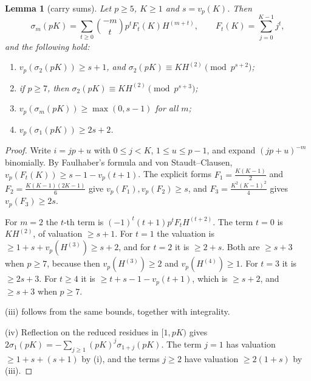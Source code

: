 \documentclass[11pt]{amsart}
\newtheorem{lemma}[theorem]{Lemma}
\theoremstyle{definition}
\theoremstyle{remark}
\newcommand{\vp}{v_p}
\newcommand{\bin}[2]{\binom{#1}{#2}}
\begin{document}
\begin{lemma}[carry sums]\label{lem:carry}
Let $p\ge5$, $K\ge1$ and $s=\vp(K)$. Then
\[
\sigma_m(pK)=\sum_{t\ge0}\bin{-m}{t}p^tF_t(K)H^{(m+t)},\qquad F_t(K)=\sum_{j=0}^{K-1}j^t,
\]
and the following hold:
\begin{enumerate}
\item[(i)] $\vp(\sigma_2(pK))\ge s+1$, and $\sigma_2(pK)\equiv KH^{(2)}\pmod{p^{s+2}}$;
\item[(ii)] if $p\ge7$, then $\sigma_2(pK)\equiv KH^{(2)}\pmod{p^{s+3}}$;
\item[(iii)] $\vp(\sigma_m(pK))\ge\max(0,s-1)$ for all $m$;
\item[(iv)] $\vp(\sigma_1(pK))\ge2s+2$.
\end{enumerate}
\end{lemma}
\begin{proof}
Write $i=jp+u$ with $0\le j<K$, $1\le u\le p-1$, and expand $(jp+u)^{-m}$ binomially.
By Faulhaber's formula and von Staudt--Clausen, $\vp(F_t(K))\ge s-1-\vp(t+1)$. The explicit
forms $F_1=\frac{K(K-1)}2$ and $F_2=\frac{K(K-1)(2K-1)}6$ give $\vp(F_1),\vp(F_2)\ge s$, and
$F_3=\frac{K^2(K-1)^2}{4}$ gives $\vp(F_3)\ge 2s$.

For $m=2$ the $t$-th term is $(-1)^t(t+1)p^tF_tH^{(t+2)}$. The term $t=0$ is $KH^{(2)}$, of
valuation $\ge s+1$. For $t=1$ the valuation is $\ge 1+s+\vp(H^{(3)})\ge s+2$, and for $t=2$
it is $\ge 2+s$. Both are $\ge s+3$ when $p\ge7$, because then $\vp(H^{(3)})\ge2$ and
$\vp(H^{(4)})\ge1$. For $t=3$ it is $\ge 2s+3$. For
$t\ge4$ it is $\ge t+s-1-\vp(t+1)$, which is $\ge s+2$, and $\ge s+3$ when $p\ge7$.

(iii) follows from the same bounds, together with integrality.

(iv) Reflection on the reduced residues in $[1,pK)$ gives
$2\sigma_1(pK)=-\sum_{j\ge1}(pK)^j\sigma_{1+j}(pK)$. The term $j=1$ has valuation
$\ge1+s+(s+1)$ by (i), and the terms $j\ge2$ have valuation $\ge 2(1+s)$ by (iii).
\end{proof}
\end{document}
